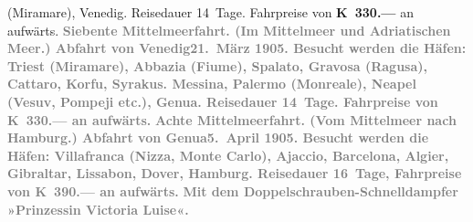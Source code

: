 {\begin{ledgroupsized}[t]{13cm}
{{                     (Miramare), Venedig. Reisedauer 14 Tage. Fahrpreise von \textbf{K 330.—}
                  an aufwärts.}}\pend
           \pstart
           \textcolor{gray}{\textbf{\textbf{Siebente Mittelmeerfahrt.}
                  (Im Mittelmeer und Adriatischen Meer.) Abfahrt
                  von Venedig\textbf{21. März 1905}. Besucht werden die Häfen: Triest (Miramare), Abbazia (Fiume), Spalato, Gravosa (Ragusa), Cattaro, Korfu, Syrakus. Messina, Palermo (Monreale), Neapel (Vesuv, Pompeji etc.), Genua. Reisedauer 14 Tage. Fahrpreise von \textbf{K 330.—} an aufwärts.}}\pend
           \pstart
           \textcolor{gray}{\textbf{\textbf{Achte Mittelmeerfahrt.}
                  (Vom Mittelmeer nach Hamburg.) Abfahrt von Genua\textbf{5. April 1905}. Besucht werden die Häfen: Villafranca
                     (Nizza, Monte
                     Carlo), Ajaccio, Barcelona, Algier, Gibraltar, Lissabon, Dover, Hamburg. Reisedauer 16 Tage, Fahrpreise von \textbf{K 390.—} an aufwärts.}}\pend
           {\bigskip}\pstart
           \noindent{}\centering{}\textcolor{gray}{\textbf{Mit dem Doppelschrauben-Schnelldampfer »Prinzessin Victoria
                  Luise«.}}\pend
           \pstart

\end{ledgroupsized}}

